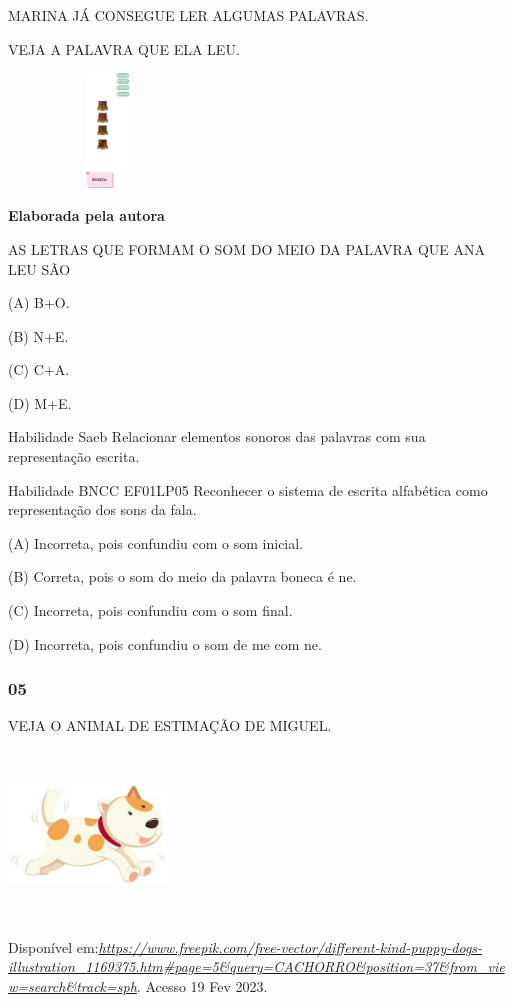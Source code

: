 \begin{escola}
MARINA JÁ CONSEGUE LER ALGUMAS PALAVRAS.

VEJA A PALAVRA QUE ELA LEU.

\includegraphics[width=2.07917in,height=1.19306in]{media/image213.png}

\textbf{Elaborada pela autora}

AS LETRAS QUE FORMAM O SOM DO MEIO DA PALAVRA QUE ANA LEU SÃO

(A) B+O.

(B) N+E.

(C) C+A.

(D) M+E.

Habilidade Saeb Relacionar elementos sonoros das palavras com sua
representação escrita.

Habilidade BNCC EF01LP05 Reconhecer o sistema de escrita alfabética como
representação dos sons da fala.

(A) Incorreta, pois confundiu com o som inicial.

(B) Correta, pois o som do meio da palavra boneca é ne.

(C) Incorreta, pois confundiu com o som final.

(D) Incorreta, pois confundiu o som de me com
ne.\protect\hypertarget{_heading=h.1meprgjlpdif}{}{}

\subsubsection{05}\label{section-45}

VEJA O ANIMAL DE ESTIMAÇÃO DE MIGUEL.

\includegraphics[width=1.65208in,height=1.75972in]{media/image214.jpg}

Disponível
em:\href{https://www.freepik.com/free-vector/different-kind-puppy-dogs-illustration_1169375.htm\#page=5\&query=CACHORRO\&position=37\&from_view=search\&track=sph}{\emph{https://www.freepik.com/free-vector/different-kind-puppy-dogs-illustration\_1169375.htm\#page=5\&query=CACHORRO\&position=37\&from\_view=search\&track=sph}}.
Acesso 19 Fev 2023.


\end{escola}
